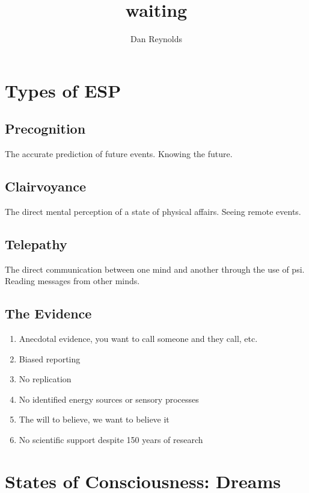 \documentclass[12pt]{article}
\title{waiting}
\author{Dan Reynolds}
\begin{document}
\maketitle
\section*{Types of ESP}
\subsection*{Precognition}
The accurate prediction of future events. Knowing the future.
\subsection*{Clairvoyance}
The direct mental perception of a state of physical affairs. Seeing remote events.
\subsection*{Telepathy}
The direct communication between one mind and another through the use of psi. Reading messages from other minds.

\subsection*{The Evidence}
\begin{enumerate}
  \item Anecdotal evidence, you want to call someone and they call, etc. 
  \item Biased reporting
  \item No replication
  \item No identified energy sources or sensory processes
  \item The will to believe, we want to believe it
  \item No scientific support despite 150 years of research
\end{enumerate}
\section*{States of Consciousness: Dreams}
\end{document}
